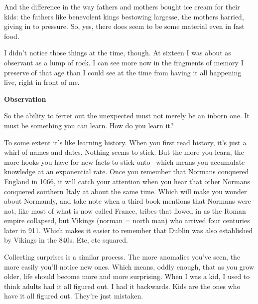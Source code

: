                   And the difference in the way fathers and mothers bought ice
                  cream for their kids: the fathers like benevolent kings
                  bestowing largesse, the mothers harried, giving in to
                  pressure. So, yes, there does seem to be some material even in
                  fast food.

I didn't notice those things at the
                  time, though. At sixteen I was about as observant as a lump of
                  rock. I can see more now in the fragments of memory I preserve
                  of that age than I could see at the time from having it all
                  happening live, right in front of me.

\textbf{Observation}

So the ability to ferret out the unexpected must
                  not merely be an inborn one. It must be something you can
                  learn. How do you learn it?

To some extent it's
                  like learning history. When you first read history, it's just
                  a whirl of names and dates. Nothing seems to stick. But the
                  more you learn, the more hooks you have for new facts to stick
                  onto-- which means you accumulate knowledge at an exponential
                  rate. Once you remember that Normans conquered England in
                  1066, it will catch your attention when you hear that other
                  Normans conquered southern Italy at about the same time. Which
                  will make you wonder about Normandy, and take note when a
                  third book mentions that Normans were not, like most of what
                  is now called France, tribes that flowed in as the Roman
                  empire collapsed, but Vikings (norman = north man) who arrived
                  four centuries later in 911. Which makes it easier to remember
                  that Dublin was also established by Vikings in the 840s. Etc,
                  etc squared.

Collecting surprises is a similar
                  process. The more anomalies you've seen, the more easily
                  you'll notice new ones. Which means, oddly enough, that as you
                  grow older, life should become more and more surprising. When
                  I was a kid, I used to think adults had it all figured out. I
                  had it backwards. Kids are the ones who have it all figured
                  out. They're just mistaken.

